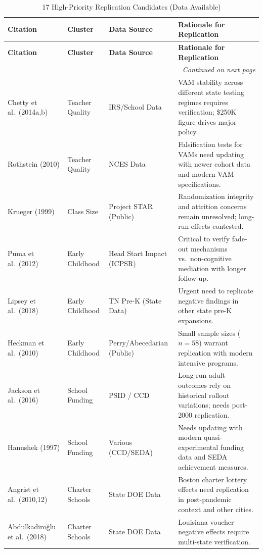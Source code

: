 \documentclass[12pt,letterpaper]{article}
\begin{document}
\begin{longtable}{p{4.5cm} p{2.5cm} p{2cm} p{5.5cm}}
\caption{17 High-Priority Replication Candidates (Data Available)} \\
\toprule
\textbf{Citation} & \textbf{Cluster} & \textbf{Data Source} & \textbf{Rationale for Replication} \\
\midrule
\endfirsthead
\toprule
\textbf{Citation} & \textbf{Cluster} & \textbf{Data Source} & \textbf{Rationale for Replication} \\
\midrule
\endhead
\midrule
\multicolumn{4}{r}{\textit{Continued on next page}} \\
\endfoot
\bottomrule
\endlastfoot
Chetty et al.\ (2014a,b) & Teacher Quality & IRS/School Data & VAM stability across different state testing regimes requires verification; \$250K figure drives major policy. \\
Rothstein (2010) & Teacher Quality & NCES Data & Falsification tests for VAMs need updating with newer cohort data and modern VAM specifications. \\
Krueger (1999) & Class Size & Project STAR (Public) & Randomization integrity and attrition concerns remain unresolved; long-run effects contested. \\
Puma et al.\ (2012) & Early Childhood & Head Start Impact (ICPSR) & Critical to verify fade-out mechanisms vs.\ non-cognitive mediation with longer follow-up. \\
Lipsey et al.\ (2018) & Early Childhood & TN Pre-K (State Data) & Urgent need to replicate negative findings in other state pre-K expansions. \\
Heckman et al.\ (2010) & Early Childhood & Perry/Abecedarian (Public) & Small sample sizes ($n=58$) warrant replication with modern intensive programs. \\
Jackson et al.\ (2016) & School Funding & PSID / CCD & Long-run adult outcomes rely on historical rollout variations; needs post-2000 replication. \\
Hanushek (1997) & School Funding & Various (CCD/SEDA) & Needs updating with modern quasi-experimental funding data and SEDA achievement measures. \\
Angrist et al.\ (2010,12) & Charter Schools & State DOE Data & Boston charter lottery effects need replication in post-pandemic context and other cities. \\
Abdulkadiro\u{g}lu et al.\ (2018) & Charter Schools & State DOE Data & Louisiana voucher negative effects require multi-state verification. \\

\end{longtable}
\end{document}
